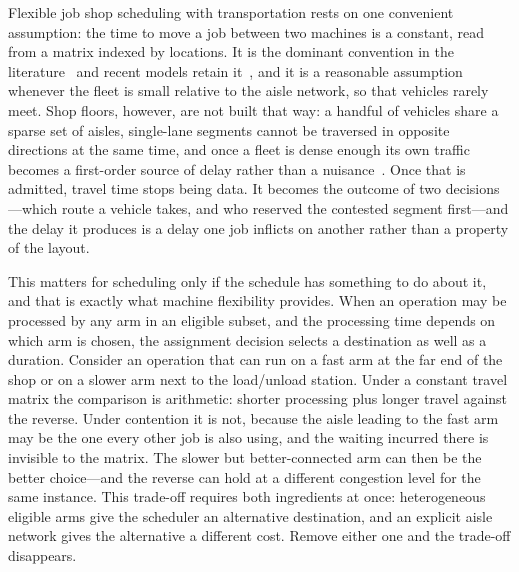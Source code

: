 \documentclass[manuscript,screen,review]{acmart}
\begin{document}
Flexible job shop scheduling with transportation rests on one convenient
assumption: the time to move a job between two machines is a constant, read from
a matrix indexed by locations. It is the dominant convention in the
literature~\cite{xin2025review} and recent models retain
it~\cite{meng2025cp,qin2026knowledge,fu2025integrated}, and it is a reasonable
assumption whenever the fleet is small relative to the aisle network, so that
vehicles rarely meet. Shop floors, however, are not built that way: a handful of
vehicles share a sparse set of aisles, single-lane segments cannot be traversed
in opposite directions at the same time, and once a fleet is dense enough its own
traffic becomes a first-order source of delay rather than a
nuisance~\cite{kim2026congestion}. Once that is admitted, travel time stops
being data. It becomes the outcome of two decisions---which route a vehicle
takes, and who reserved the contested segment first---and the delay it produces
is a delay one job inflicts on another rather than a property of the layout.

This matters for scheduling only if the schedule has something to do about it,
and that is exactly what machine flexibility provides. When an operation may be
processed by any arm in an eligible subset, and the processing time depends on
which arm is chosen, the assignment decision selects a destination as well as a
duration. Consider an operation that can run on a fast arm at the far end of the
shop or on a slower arm next to the load/unload station. Under a constant travel
matrix the comparison is arithmetic: shorter processing plus longer travel
against the reverse. Under contention it is not, because the aisle leading to
the fast arm may be the one every other job is also using, and the waiting
incurred there is invisible to the matrix. The slower but better-connected arm
can then be the better choice---and the reverse can hold at a different
congestion level for the same instance. This trade-off requires both ingredients
at once: heterogeneous eligible arms give the scheduler an alternative
destination, and an explicit aisle network gives the alternative a different
cost. Remove either one and the trade-off disappears.

\end{document}
